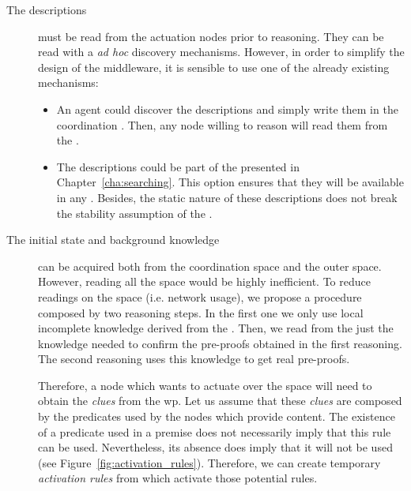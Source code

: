 \begin{description}
  \item[The descriptions] must be read from the actuation nodes prior to reasoning. %
        They can be read with a \emph{ad hoc} discovery mechanisms.
        However, in order to simplify the design of the middleware, it is sensible to use one of the already existing mechanisms:
        
        \begin{itemize}
	  \item An agent could discover the descriptions and simply write them in the coordination \Space{}. %
		Then, any node willing to reason will read them from the \Space{}.
	  \item The descriptions could be part of the \clues{} presented in Chapter~\ref{cha:searching}.
		This option ensures that they will be available in any \consumer{}.
		Besides, the static nature of these descriptions does not break the stability assumption of the \clues{}. %
        \end{itemize}

  \item[The initial state and background knowledge] can be acquired both from the coordination space and the outer space.
	However, reading all the space would be highly inefficient.
	To reduce readings on the space (i.e. network usage), we propose a procedure composed by two reasoning steps.
	In the first one we only use local incomplete knowledge derived from the \clues{}.
	Then, we read from the \Space{} just the knowledge needed to confirm the pre-proofs obtained in the first reasoning.
	The second reasoning uses this knowledge to get real pre-proofs. %
	
	Therefore, a node which wants to actuate over the space will need to obtain the \emph{clues} from the \ac{wp}.
	Let us assume that these \emph{clues} are composed by the predicates used by the nodes which provide content. %
	The existence of a predicate used in a premise does not necessarily imply that this rule can be used.
	Nevertheless, its absence does imply that it will not be used (see Figure~\ref{fig:activation_rules}).
	Therefore, we can create temporary \emph{activation rules} from \clues{} which activate those potential rules. %


\end{description}

